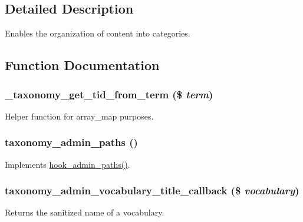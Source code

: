 \subsection{Detailed Description}
Enables the organization of content into categories. 

\subsection{Function Documentation}
\hypertarget{taxonomy_8module_a49288ce812a2d7b064e189eccc7d43a2}{
\subsubsection[{\_\-taxonomy\_\-get\_\-tid\_\-from\_\-term}]{\setlength{\rightskip}{0pt plus 5cm}\_\-taxonomy\_\-get\_\-tid\_\-from\_\-term (\$ {\em term})}}
\label{taxonomy_8module_a49288ce812a2d7b064e189eccc7d43a2}
Helper function for array\_\-map purposes. \hypertarget{taxonomy_8module_ad82ed1d72ca6f1c3cd42884af95c0d46}{
\subsubsection[{taxonomy\_\-admin\_\-paths}]{\setlength{\rightskip}{0pt plus 5cm}taxonomy\_\-admin\_\-paths ()}}
\label{taxonomy_8module_ad82ed1d72ca6f1c3cd42884af95c0d46}
Implements \hyperlink{group__hooks_ga3fe6d93afc8bb04afbd9e3c326d1bdc1}{hook\_\-admin\_\-paths()}. \hypertarget{taxonomy_8module_a62328d8648894cb0a371970736ce2caf}{
\subsubsection[{taxonomy\_\-admin\_\-vocabulary\_\-title\_\-callback}]{\setlength{\rightskip}{0pt plus 5cm}taxonomy\_\-admin\_\-vocabulary\_\-title\_\-callback (\$ {\em vocabulary})}}
\label{taxonomy_8module_a62328d8648894cb0a371970736ce2caf}
Returns the sanitized name of a vocabulary.

